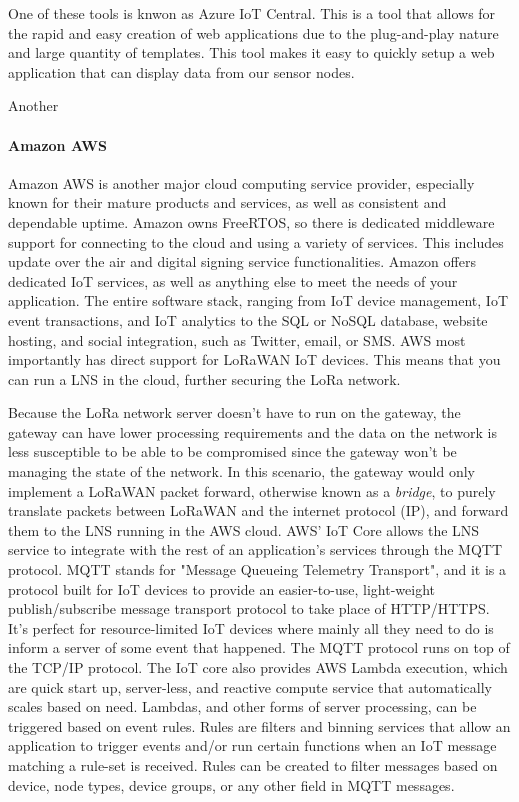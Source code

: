One of these tools is knwon as Azure IoT Central. This is a tool that allows for the rapid and easy creation of web applications due to the plug-and-play nature and large quantity of templates. This tool makes it easy to quickly setup a web application that can display data from our sensor nodes.

Another 

\paragraph{Amazon AWS}
Amazon AWS is another major cloud computing service provider, especially known
for their mature products and services, as well as consistent and dependable
uptime. Amazon owns FreeRTOS, so there is dedicated middleware support for
connecting to the cloud and using a variety of services. This includes update
over the air and digital signing service functionalities. Amazon offers
dedicated IoT services, as well as anything else to meet the needs of your
application. The entire software stack, ranging from IoT device management, IoT
event transactions, and IoT analytics to the SQL or NoSQL database, website
hosting, and social integration, such as Twitter, email, or SMS. AWS most
importantly has direct support for LoRaWAN IoT devices. This means that you can
run a LNS in the cloud, further securing the LoRa network. 


Because the LoRa network server doesn't have to run on the gateway, the gateway
can have lower processing requirements and the data on the network is  less
susceptible to be able to be compromised since the gateway won't be managing the
state of the network. In this scenario, the gateway would only implement a
LoRaWAN packet forward, otherwise known as a \emph{bridge}, to purely translate
packets between LoRaWAN and the internet protocol (IP), and forward them to the
LNS running in the AWS cloud. AWS' IoT Core allows the LNS service to integrate
with the rest of an application's services through the MQTT protocol. MQTT
stands for "Message Queueing Telemetry Transport", and it is a protocol built
for IoT devices to provide an easier-to-use, light-weight publish/subscribe
message transport protocol to take place of HTTP/HTTPS. It's perfect for
resource-limited IoT devices where mainly all they need to do is inform a server
of some event that happened. The MQTT protocol runs on top of the TCP/IP
protocol. The IoT core also provides AWS Lambda execution, which are quick start
up, server-less, and reactive compute service that automatically scales based on
need. Lambdas, and other forms of server processing, can be triggered based on
event rules. Rules are filters and binning services that allow an application to
trigger events and/or run certain functions when an IoT message matching a
rule-set is received. Rules can be created to filter messages based on device,
node types, device groups, or any other field in MQTT messages.


